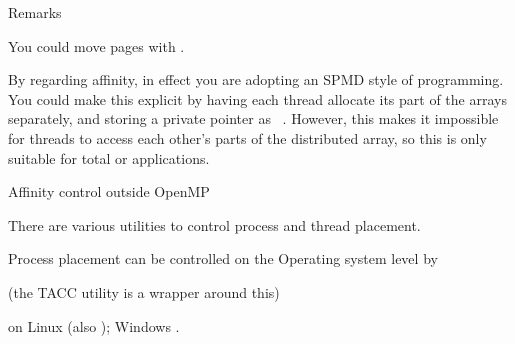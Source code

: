  {Remarks}

You could move pages with .

By regarding affinity,
in effect you are adopting an \ac{SPMD} style of programming.
You could make this explicit by having each thread allocate its part
of the arrays separately, and storing a private pointer as
~\cite{Liu:2003:OMP-SPMD}. However, this
makes it impossible for threads to access each other's parts of the
distributed array, so this is only suitable for
total  or
 applications.

\begin{comment}
[c202-002 c:1] export OMP_PLACES=cores
[c202-002 c:2] export OMP_PROC_BIND=close
[c202-002 c:3] make heat && OMP_NUM_THREADS=56 ./heat
make: `heat' is up to date.
Time=  2.0048 #ops=2.000e+09 on 56 threads
[c202-002 c:4] make heat && OMP_NUM_THREADS=56 ./heat
make: `heat' is up to date.
Time=  2.2479 #ops=2.000e+09 on 56 threads
[c202-002 c:5] make heat && OMP_NUM_THREADS=56 ./heat
make: `heat' is up to date.
Time=  1.9717 #ops=2.000e+09 on 56 threads
[c202-002 c:6] make heat && OMP_NUM_THREADS=56 ./heat
make: `heat' is up to date.
Time=  2.1107 #ops=2.000e+09 on 56 threads
[c202-002 c:7] make heat && OMP_NUM_THREADS=56 ./heat
make: `heat' is up to date.
Time=  2.1087 #ops=2.000e+09 on 56 threads
[c202-002 c:8] make heat && OMP_NUM_THREADS=56 ./heat 1
make: `heat' is up to date.
Parallel init
Time=  1.0420 #ops=2.000e+09 on 56 threads
[c202-002 c:9] make heat && OMP_NUM_THREADS=56 ./heat 1
make: `heat' is up to date.
Parallel init
Time=  0.9962 #ops=2.000e+09 on 56 threads
[c202-002 c:10] make heat && OMP_NUM_THREADS=56 ./heat 1
make: `heat' is up to date.
Parallel init
Time=  1.0077 #ops=2.000e+09 on 56 threads
[c202-002 c:11] make heat && OMP_NUM_THREADS=56 ./heat 1
make: `heat' is up to date.
Parallel init
Time=  0.9939 #ops=2.000e+09 on 56 threads
[c202-002 c:12] make heat && OMP_NUM_THREADS=56 ./heat 1
make: `heat' is up to date.
Parallel init
Time=  0.9880 #ops=2.000e+09 on 56 threads
\end{comment}

 {Affinity control outside OpenMP}

There are various utilities to control process and thread placement.

Process placement can be controlled on the Operating system level by
\begin{tacc}
(the TACC utility  is a wrapper around this)
\end{tacc}
on Linux (also ); Windows
.

